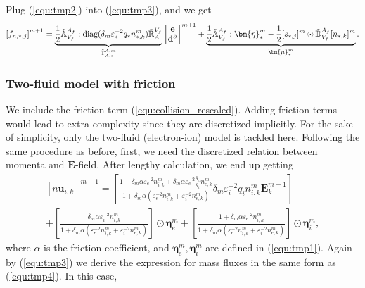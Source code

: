 \documentclass{article}
\begin{document}
Plug (\ref{equ:tmp2}) into (\ref{equ:tmp3}), and we get
\begin{equation} \label{equ:tmp4}
    \left[f_{n,*,j}\right]^{m+1} = \underbrace{\frac{1}{2} \Tilde{\mathbb{A}}_{V_f}^{A_f} : \text{diag}(\delta_m \varepsilon^{-2}_* q_* n^m_{*,k}) \Tilde{\mathbb{R}}^{V_f}_{A}}_{\Tilde{\mathbb{T}}_{A,*}^{A,m}}   
    \begin{bmatrix}
    \mathbf{e} \\
    \mathbf{d}^\partial 
    \end{bmatrix}^{m+1} + \underbrace{\frac{1}{2}\Tilde{\mathbb{A}}_{V_f}^{A_f} :\bm{\eta}^m_* - \frac{1}{2} [s_{*,j}]^m \odot \Tilde{\mathbb{D}}_{V_f}^{A_f} [n_{*,k}]^m}_{\bm{\mu}^m_*}.
\end{equation} 

\subsubsection{Two-fluid model with friction}
We include the friction term (\ref{equ:collision_rescaled}). Adding friction terms would lead to extra complexity since they are discretized implicitly. For the sake of simplicity, only the two-fluid (electron-ion) model is tackled here. Following the same procedure as before, first, we need the discretized relation between momenta and $\mathbf{E}$-field. After lengthy calculation, we end up getting
\begin{multline}\label{equ:tmp13}
    [n\mathbf{u}_{i,k}]^{m+1} = \left[\frac{1 + \delta_m \alpha \varepsilon_e^{-2} n_{i,k}^m + \delta_m \alpha \varepsilon_e^{-2} \frac{q_e}{q_i}n_{e,k}^m }{1 + \delta_m \alpha (\varepsilon^{-2}_e n_{i,k}^m + \varepsilon_i^{-2} n_{e,k}^m)} \delta_m \varepsilon^{-2}_i q_i n_{i,k}^m \mathbf{E}^{m+1}_k\right] \\
    + \left[\frac{\delta_m \alpha \varepsilon_i^{-2} n_{i,k}^m}{1 + \delta_m \alpha (\varepsilon^{-2}_e n_{i,k}^m + \varepsilon^{-2}_i n_{e,k}^m)}\right] \odot \bm{\eta}_e^m + \left[\frac{1 + \delta_m \alpha \varepsilon^{-2}_e n_{i,k}^m}{1 + \delta_m \alpha (\varepsilon^{-2}_e n_{i,k}^m + \varepsilon^{-2}_i n_{e,k}^m)}\right] \odot \bm{\eta}_i^m,
\end{multline}
where $\alpha$ is the friction coefficient, and $\bm{\eta}_e^m, \bm{\eta}_i^m$ are defined in (\ref{equ:tmp1}). Again by (\ref{equ:tmp3}) we derive the expression for mass fluxes in the same form as (\ref{equ:tmp4}). In this case, 
\end{document}
